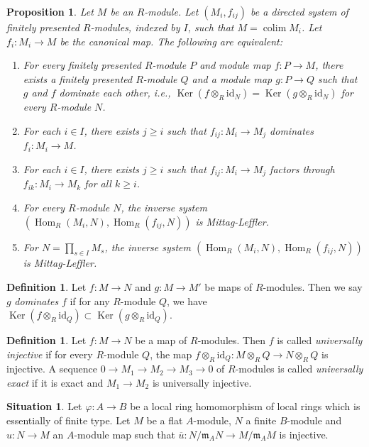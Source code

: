 \documentclass{amsart}
\theoremstyle{plain}
\newtheorem{proposition}[subsection]{Proposition}
\theoremstyle{definition}
\newtheorem{definition}[subsection]{Definition}
\newtheorem{situation}[subsection]{Situation}
\theoremstyle{remark}
\numberwithin{equation}{subsection}
\def\colim{\mathop{\mathrm{colim}}\nolimits}
\def\Hom{\mathop{\mathrm{Hom}}\nolimits}
\def\Ker{\mathop{\mathrm{Ker}}}
\begin{document}
\begin{proposition}
\label{algebra-proposition-ML-characterization}
Let $M$ be an $R$-module.  Let $(M_i, f_{ij})$ be a directed system of finitely
presented $R$-modules, indexed by $I$, such that $M = \colim M_i$.  Let
$f_i:
M_i \to M$ be the canonical map.  The following are equivalent:
\begin{enumerate}
\item For every finitely presented $R$-module $P$ and module map $f: P
\to M$, there exists a finitely presented $R$-module $Q$ and a module
map $g: P \to Q$ such that $g$ and $f$ dominate each other, i.e.,
$\Ker(f \otimes_R \text{id}_N) = \Ker(g \otimes_R \text{id}_N)$
for every $R$-module $N$.
\item For each $i \in I$, there exists $j \geq i$ such that $f_{ij}: M_i
\to M_j$ dominates $f_i: M_i \to M$.
\item For each $i \in I$, there exists $j \geq i$ such that $f_{ij}: M_i
\to M_j$ factors through $f_{ik}: M_i \to M_k$ for all $k \geq
i$.
\item For every $R$-module $N$, the inverse system
$(\Hom_R(M_i, N), \Hom_R(f_{ij}, N))$ is Mittag-Leffler.
\item For $N = \prod_{s \in I} M_s$, the inverse system
$(\Hom_R(M_i, N), \Hom_R(f_{ij}, N))$ is Mittag-Leffler.
\end{enumerate}
\end{proposition}

\begin{definition}
\label{algebra-definition-domination}
Let $f: M \to N$ and $g: M \to M'$ be maps of $R$-modules.
Then we say $g$ {\it dominates} $f$ if for any $R$-module $Q$, we have $\Ker(f
\otimes_R \text{id}_Q) \subset \Ker(g \otimes_R \text{id}_Q)$.
\end{definition}

\begin{definition}
\label{algebra-definition-universally-injective}
Let $f: M \to N$ be a map of $R$-modules.  Then $f$ is called
{\it universally injective} if for every $R$-module $Q$, the map $f
\otimes_R \text{id}_Q: M \otimes_R Q \to N \otimes_R Q$
is injective.  A sequence $0 \to M_1 \to M_2 \to M_3
\to 0$ of $R$-modules is called {\it universally exact} if it is exact
and $M_1 \to M_2$ is universally injective.
\end{definition}

\begin{situation}
\label{situation-mod-injective}
Let $\varphi : A \to B$ be a local ring homomorphism of local rings
which is essentially of finite type. Let $M$ be a flat $A$-module,
$N$ a finite $B$-module and $u : N \to M$ an $A$-module map such that
$\overline{u} : N/\mathfrak m_AN \to M/\mathfrak m_AM$ is injective.
\end{situation}
\end{document}
